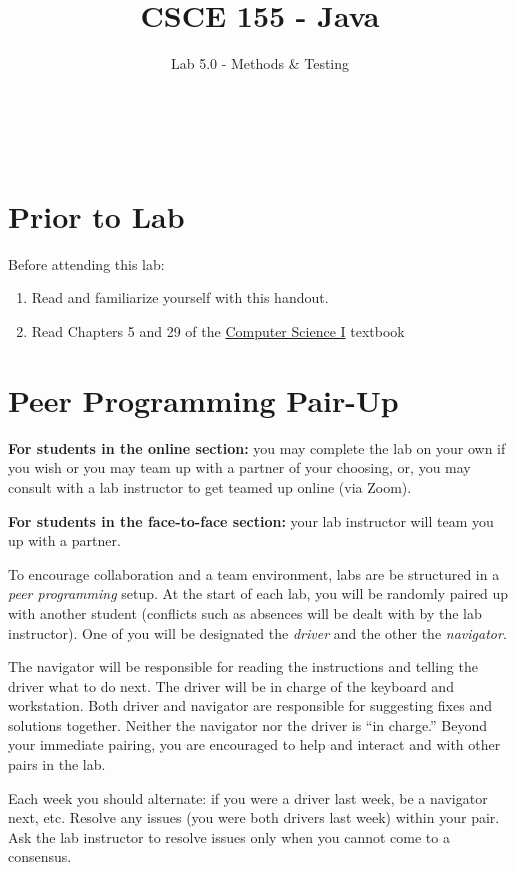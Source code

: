 \documentclass[12pt]{scrartcl}
\title{CSCE 155 - Java}
\subtitle{Lab 5.0 - Methods \& Testing}
\author{~}
\date{~}
\begin{document}
\maketitle

\section*{Prior to Lab}

Before attending this lab:
\begin{enumerate}
  \item Read and familiarize yourself with this handout.
  \item Read Chapters 5 and 29 of the \href{http://cse.unl.edu/~cbourke/ComputerScienceOne.pdf}{Computer Science I} textbook
\end{enumerate}

\section*{Peer Programming Pair-Up}

\textbf{For students in the online section:} you may complete
the lab on your own if you wish or you may team up with a partner
of your choosing, or, you may consult with a lab instructor to get
teamed up online (via Zoom).

\textbf{For students in the face-to-face section:} your
lab instructor will team you up with a partner.  

To encourage collaboration and a team environment, labs are be
structured in a \emph{peer programming} setup.  At the start of
each lab, you will be randomly paired up with another student 
(conflicts such as absences will be dealt with by the lab instructor).
One of you will be designated the \emph{driver} and the other
the \emph{navigator}.  

The navigator will be responsible for reading the instructions and
telling the driver what to do next.  The driver will be in charge of the
keyboard and workstation.  Both driver and navigator are responsible
for suggesting fixes and solutions together.  Neither the navigator
nor the driver is ``in charge.''  Beyond your immediate pairing, you
are encouraged to help and interact and with other pairs in the lab.

Each week you should alternate: if you were a driver last week, 
be a navigator next, etc.  Resolve any issues (you were both drivers
last week) within your pair.  Ask the lab instructor to resolve issues
only when you cannot come to a consensus.  
\end{document}
